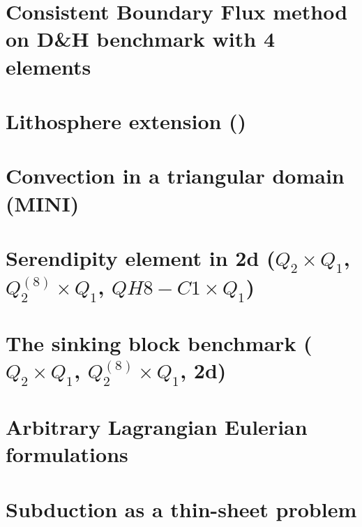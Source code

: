 \documentclass[a4paper,11pt]{report}
\begin{document}
\chapter{Consistent Boundary Flux method on D\&H benchmark with 4 elements \label{f49}} %

\chapter{Lithosphere extension (\QtwoQone)\label{f50}} %

\chapter{Convection in a triangular domain (MINI)\label{f51}} %

\chapter{Serendipity element in 2d ($Q_2\times Q_1$, $Q_2^{(8)}\times Q_1$, $QH8-C1\times Q_1$) \label{f52}} %

\chapter{The sinking block benchmark ($Q_2\times Q_1$, $Q_2^{(8)}\times Q_1$, 2d) \label{f53}} %

\chapter{Arbitrary Lagrangian Eulerian formulations \label{f54}} %

\chapter{Subduction as a thin-sheet problem  \label{f55}} %
\end{document}

